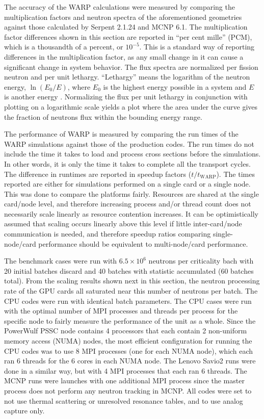 \documentclass[preprint,12pt]{elsarticle}
\begin{document}
The accuracy of the WARP calculations were measured by comparing the multiplication factors and neutron spectra of the aforementioned geometries against those calculated by Serpent 2.1.24 and MCNP 6.1.  The multiplication factor differences shown in this section are reported in ``per cent mille'' (PCM), which is a thousandth of a percent, or $10^{-5}$.  This is a standard way of reporting differences in the multiplication factor, as any small change in it can cause a significant change in system behavior.  The flux spectra are normalized per fission neutron and per unit lethargy.   ``Lethargy'' means the logarithm of the neutron energy, $\ln(E_0/E)$, where $E_0$ is the highest energy possible in a system and $E$ is another energy \cite{duderstadt}.  Normalizing the flux per unit lethargy in conjunction with plotting on a logarithmic scale yields a plot where the area under the curve gives the fraction of neutrons flux within the bounding energy range. 

The performance of WARP is measured by comparing the run times of the WARP simulations against those of the production codes.  The run times do not include the time it takes to load and process cross sections before the simulations.  In other words, it is only the time it takes to complete all the transport cycles.  The difference in runtimes are reported in speedup factors ($t/t_\mathrm{WARP}$).  The times reported are either for simulations performed on a single card or a single node.  This was done to compare the platforms fairly.  Resources are shared at the single card/node level, and therefore increasing process and/or thread count does not necessarily scale linearly as resource contention increases.  It can be optimistically assumed that scaling occurs linearly above this level if little inter-card/node communication is needed, and therefore speedup ratios comparing single-node/card performance should be equivalent to multi-node/card performance.

The benchmark cases were run with $6.5\times10^6$ neutrons per criticality bach with 20 initial batches discard and 40 batches with statistic accumulated (60 batches total).  From the scaling results shown next in this section, the neutron processing rate of the GPU cards all saturated near this number of neutrons per batch.  The CPU codes were run with identical batch parameters.  The CPU cases were run with the optimal number of MPI processes and threads per process for the specific node to fairly measure the performance of the unit as a whole.  Since the PowerWulf PSSC node contains 4 processors that each contain 2 non-uniform memory access (NUMA) nodes, the most efficient configuration for running the CPU codes was to use 8 MPI processes (one for each NUMA node), which each ran 6 threads for the 6 cores in each NUMA node.  The Lenovo Savio2 runs were done in a similar way, but with 4 MPI processes that each ran 6 threads.  The MCNP runs were launches with one additional MPI process since the master process does not perform any neutron tracking in MCNP.  All codes were set to not use thermal scattering or unresolved resonance tables, and to use analog capture only.
\end{document}

